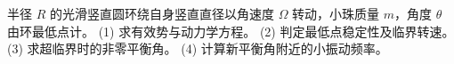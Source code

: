 半径 $R$ 的光滑竖直圆环绕自身竖直直径以角速度 $\Omega$ 转动，小珠质量 $m$，角度 $\theta$ 由环最低点计。
(1) 求有效势与动力学方程。
(2) 判定最低点稳定性及临界转速。
(3) 求超临界时的非零平衡角。
(4) 计算新平衡角附近的小振动频率。
